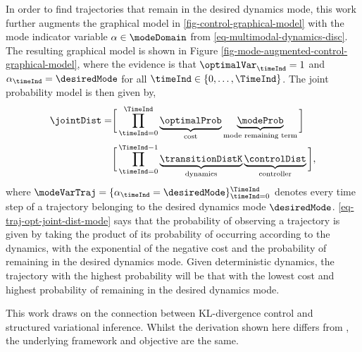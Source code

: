 \documentclass{mimosis-class/mimosis}
\numberwithin{equation}{chapter}
\newcommand{\modeVar}{\ensuremath{\alpha}}
\begin{document}
{In order to find trajectories that remain in the desired
dynamics mode, this work further augments
the graphical model in \cref{fig-control-graphical-model} with the mode indicator variable \(\modeVar \in \modeDomain\)
from \cref{eq-multimodal-dynamics-disc}.
The resulting graphical model is shown in Figure \ref{fig-mode-augmented-control-graphical-model},
where the evidence is that \(\optimalVar_{\timeInd}=1\) and \(\modeVar_{\timeInd}=\desiredMode\) for
all \(\timeInd \in \{0,\ldots,\TimeInd\}\).
The joint probability model is then given by,
\begin{align} \label{eq-traj-opt-joint-dist-mode}
\jointDist =
&\bigg[ \prod_{\timeInd=0}^{\TimeInd}
\underbrace{\optimalProb}_{\text{cost}}
\underbrace{\modeProb}_{\text{mode remaining term}} \bigg] \nonumber \\
&\bigg[ \prod_{\timeInd=0}^{\TimeInd-1}
\underbrace{\transitionDistK}_{\text{dynamics}}
\underbrace{\controlDist}_{\text{controller}} \bigg],
\end{align}
where \(\modeVarTraj = \{\modeVar_{\timeInd}=\desiredMode \}_{\timeInd=0}^{\TimeInd}\)
denotes every time step of a trajectory belonging to the desired dynamics mode \(\desiredMode\).
\cref{eq-traj-opt-joint-dist-mode} says
that the probability of observing a trajectory is given by taking the product of its probability of occurring
according to the dynamics, with the exponential of the negative cost and the probability of remaining
in the desired dynamics mode.
Given deterministic dynamics, the trajectory with the highest probability will be that with the lowest
cost and highest probability of remaining in the desired dynamics mode.


This work draws on the connection between KL-divergence control \citep{rawlikStochastic2013}
and structured variational inference.
Whilst the derivation shown here differs from \cite{rawlikStochastic2013}, the underlying framework and
objective are the same.

}
\end{document}
